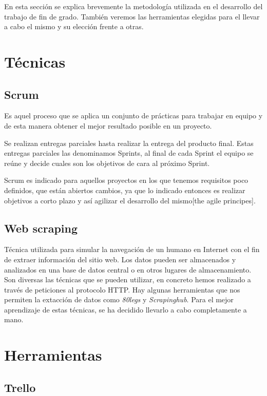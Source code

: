 

En esta sección se explica brevemente la metodología utilizada en el desarrollo del trabajo de fin de grado. También veremos las herramientas elegidas para el llevar a cabo el mismo y su elección frente a otras.

\section{Técnicas}

\subsection{Scrum} 
Es aquel proceso que se aplica un conjunto de prácticas para trabajar en equipo y de esta manera obtener el mejor resultado posible en un proyecto.

Se realizan entregas parciales hasta realizar la entrega del producto final. Estas entregas parciales las denominamos Sprints, al final de cada Sprint el equipo se reúne y decide cuales son los objetivos de cara al próximo Sprint.

Scrum es indicado para aquellos proyectos en los que  tenemos requisitos poco definidos, que están abiertos cambios, ya que lo indicado entonces es realizar objetivos a corto plazo y así  agilizar el desarrollo del mismo[the agile principes].

\subsection{Web scraping}

Técnica utilizada para simular  la navegación de un humano en Internet con el fin de extraer información del sitio web. Los datos pueden ser almacenados y analizados en una base de datos central o en otros lugares de almacenamiento.  Son diversas las técnicas que se pueden utilizar, en concreto hemos realizado a través de peticiones al protocolo HTTP. Hay algunas herramientas que nos permiten la extacción de datos como \textit{80legs} y \textit{Scrapinghub}. Para el mejor aprendizaje de estas técnicas, se ha decidido llevarlo a cabo completamente a mano.

\section{Herramientas}

\subsection{Trello}

